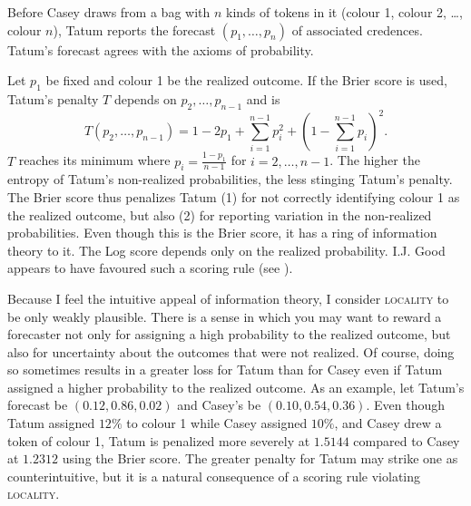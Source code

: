 \documentclass[12pt]{article}
\begin{document}

\begin{example}[Tokens]
  \label{ex:augheebi}
  Before Casey draws from a bag with $n$ kinds of tokens in it (colour
  1, colour 2, {\ldots}, colour $n$), Tatum reports the forecast
  $(p_{1},{\ldots},p_{n})$ of associated credences. Tatum's forecast
  agrees with the axioms of probability.
\end{example}

Let $p_{1}$ be fixed and colour 1 be the realized outcome. If the
Brier score is used, Tatum's penalty $T$ depends on
$p_{2},{\ldots},p_{n-1}$ and is
\begin{equation}
  \label{eq:kaewaeho}
  T(p_{2},{\ldots},p_{n-1})=1-2p_{1}+\sum_{i=1}^{n-1}p_{i}^{2}+\left(1-\sum_{i=1}^{n-1}p_{i}\right)^{2}.
\end{equation}
$T$ reaches its minimum where $p_{i}=\frac{1-p_{1}}{n-1}$ for
$i=2,{\ldots},n-1$. The higher the entropy of Tatum's non-realized
probabilities, the less stinging Tatum's penalty. The Brier score thus
penalizes Tatum (1) for not correctly identifying colour 1 as the
realized outcome, but also (2) for reporting variation in the
non-realized probabilities. Even though this is the Brier score, it
has a ring of information theory to it. The Log score depends only on
the realized probability. I.J. Good appears to have favoured such a
scoring rule (see ).

Because I feel the intuitive appeal of information theory, I consider
\textsc{locality} to be only weakly plausible. There is a sense in
which you may want to reward a forecaster not only for assigning a
high probability to the realized outcome, but also for uncertainty
about the outcomes that were not realized. Of course, doing so
sometimes results in a greater loss for Tatum than for Casey even if
Tatum assigned a higher probability to the realized outcome. As an
example, let Tatum's forecast be $(0.12,0.86,0.02)$ and Casey's be
$(0.10,0.54,0.36)$. Even though Tatum assigned $12\%$ to colour 1
while Casey assigned $10\%$, and Casey drew a token of colour 1, Tatum
is penalized more severely at $1.5144$ compared to Casey at $1.2312$
using the Brier score. The greater penalty for Tatum may strike one as
counterintuitive, but it is a natural consequence of a scoring rule
violating \textsc{locality}.
\end{document}
